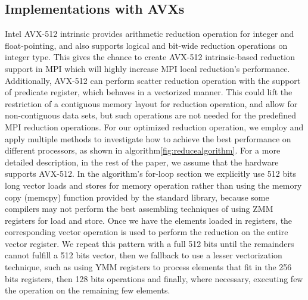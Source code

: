 \documentclass[5p,times,twocolumn]{elsarticle}
\newcommand{\mpi}[0]{\textsc{MPI}\xspace}
\begin{document}
\subsection{Implementations with AVXs}
Intel AVX-512 intrinsic provides arithmetic reduction operation for integer and
float-pointing, and also supports logical and bit-wide reduction operations on integer type.
This gives the chance to create AVX-512 intrinsic-based reduction support in \mpi which
will highly increase \mpi local reduction's performance.
Additionally, AVX-512 can perform scatter reduction operation with the
support of predicate register, which behaves in a vectorized manner. This
could lift the restriction of a contiguous memory layout for reduction operation, and allow for non-contiguous
data sets, but such operations
are not needed for the predefined MPI reduction operations. 
%
For our optimized reduction operation, we employ and apply multiple
methods to investigate how to achieve the
best performance on different processors, as shown in algorithm\ref{fig:reducealgorithm}.
For a more detailed description, in the rest of the paper, we assume that the hardware supports AVX-512.
In the algorithm's for-loop section we explicitly use 512 bits long vector loads and stores for memory operation rather than using the memory copy (memcpy) function provided by
the standard library, because some compilers may not perform
the best assembling techniques of using ZMM registers for load and store.
%
Once we have the elements loaded in registers, the corresponding vector operation is used
to perform the reduction on the entire vector register.
We repeat this pattern with a full 512 bits until the remainders cannot fulfill a 512 bits vector,
then we fallback to use a lesser vectorization technique, such as using YMM registers to process elements that fit in the 256 bits registers, then 128 bits operations and finally, where necessary, executing few the operation on the remaining few elements.
\end{document}
